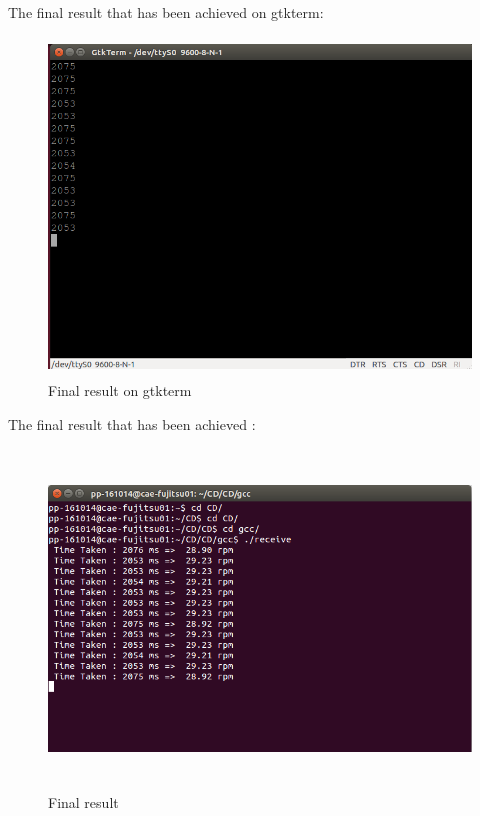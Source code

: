 \documentclass[12pt,a4paper]{article}
\begin{document}
The final result that has been achieved on gtkterm:\\
\begin{figure}[H]
\centering
\includegraphics[width=16cm,height=9cm]{gtktermresult.png}
\caption{Final result on gtkterm}
\label{Final result}
\end{figure}







The final result that has been achieved :\\
\begin{figure}[H]
\centering
\includegraphics[width=16cm,height=9cm]{ccoderesult.png}
\caption{Final result}
\label{Final result}
\end{figure}



\newpage
\end{document}
